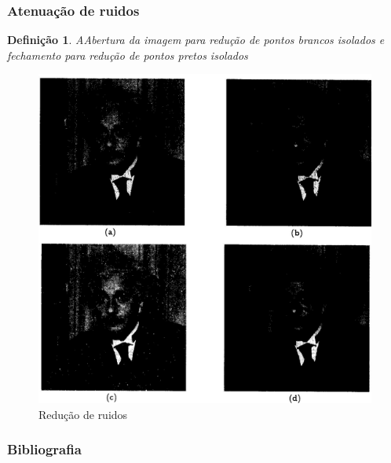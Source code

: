 \documentclass[aspectratio=169]{beamer}
\theoremstyle{Definition}
\newtheorem{defn}{Defini\c c\~ao}
\begin{document}
\begin{frame}
	\frametitle{Atenuação de ruidos}
	
	\begin{defn}
		AAbertura da imagem para redução de pontos brancos isolados e fechamento para redução de pontos pretos isolados
	\end{defn}
	
	\begin{figure}[h]
	 	\includegraphics[height=0.4\paperheight]{imagens/reducaoruidos}
		\caption{Redução de ruidos}\label{figNoise}
	\end{figure}

\end{frame}


\nocite{*}

\begin{frame}
	\frametitle{Bibliografia}
	



\end{frame}


\end{document}
